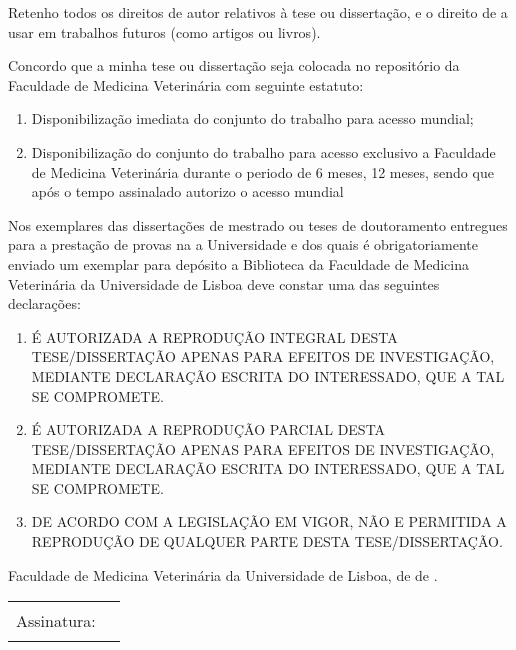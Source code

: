 Retenho todos os direitos de autor relativos à tese ou dissertação, e o direito de a usar em trabalhos futuros (como artigos ou livros).

Concordo que a minha tese ou dissertação seja colocada no repositório da Faculdade de Medicina Veterinária com seguinte estatuto:
\begin{enumerate}
  \item {} Disponibilização imediata do conjunto do trabalho para acesso mundial;
  \item {} Disponibilização do conjunto do trabalho para acesso exclusivo a Faculdade de Medicina Veterinária durante o periodo de  6 meses,
 12 meses, sendo que após o tempo assinalado autorizo o acesso mundial%
\end{enumerate}

{\footnotesize Nos exemplares das dissertações de mestrado ou teses de doutoramento entregues para a prestação de provas na a
Universidade e dos quais é obrigatoriamente enviado um exemplar para depósito a Biblioteca da Faculdade de Medicina
Veterinária da Universidade de Lisboa deve constar uma das seguintes declarações:}
\begin{enumerate}
  \item [\checkbox{reproduction}{I}] 
        É AUTORIZADA A REPRODUÇÃO INTEGRAL DESTA TESE/DISSERTAÇÃO APENAS PARA EFEITOS DE INVESTIGAÇÃO, 
        MEDIANTE DECLARAÇÃO ESCRITA DO INTERESSADO, QUE A TAL SE COMPROMETE.
  \item [\checkbox{reproduction}{P}]
        É AUTORIZADA A REPRODUÇÃO PARCIAL DESTA TESE/DISSERTAÇÃO APENAS PARA EFEITOS DE INVESTIGAÇÃO,
        MEDIANTE DECLARAÇÃO ESCRITA DO INTERESSADO, QUE A TAL SE COMPROMETE.
  \item [\checkbox{reproduction}{N}]
        DE ACORDO COM A LEGISLAÇÃO EM VIGOR, NÃO E PERMITIDA A REPRODUÇÃO DE QUALQUER PARTE DESTA
        TESE/DISSERTAÇÃO.
\end{enumerate}

Faculdade de Medicina Veterinária da Universidade de Lisboa,
 de
 de
.\par
\vspace*{2ex}
\begin{tabularx}{\linewidth}{@{}lX@{}}
Assinatura: & \rule{\linewidth}{0.75pt}
\end{tabularx}
\egroup
\vfill\null
